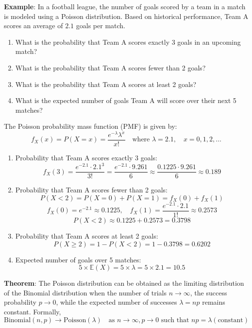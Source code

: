 \documentclass[twoside]{book}
\begin{document}
\textbf{Example}: In a football league, the number of goals scored by a team in a match is modeled using a Poisson distribution. Based on historical performance, Team A scores an average of $2.1$ goals per match.

\begin{enumerate}
    \item What is the probability that Team A scores exactly 3 goals in an upcoming match?
    \item What is the probability that Team A scores fewer than 2 goals?
    \item What is the probability that Team A scores at least 2 goals?
    \item What is the expected number of goals Team A will score over their next 5 matches?
\end{enumerate}

The Poisson probability mass function (PMF) is given by:
\[
f_X(x) = P(X=x)= \frac{e^{-\lambda} \lambda^x}{x!}
\quad \text{where } \lambda = 2.1, \quad x = 0, 1, 2, \dots
\]

\begin{enumerate}
    \item {Probability that Team A scores exactly 3 goals:}
    \[
    f_X(3)  = \frac{e^{-2.1} \cdot 2.1^3}{3!}
    = \frac{e^{-2.1} \cdot 9.261}{6}
    \approx \frac{0.1225 \cdot 9.261}{6}
    \approx 0.189
    \]

    \item {Probability that Team A scores fewer than 2 goals:}
    \[
    P(X < 2) = {P}(X = 0) + {P}(X = 1) = f_X(0) + f_X(1)
    \]
    \[
    f_X(0) = e^{-2.1} \approx 0.1225, \quad
    f_X(1) = \frac{e^{-2.1} \cdot 2.1}{1!} \approx 0.2573
    \]
    \[
    P(X < 2) \approx 0.1225 + 0.2573 = 0.3798
    \]

    \item {Probability that Team A scores at least 2 goals:}
    \[
    P(X \geq 2) = 1 - P(X < 2) = 1 - 0.3798 = 0.6202
    \]

    \item {Expected number of goals over 5 matches:}
    \[
    5 \times \mathbb{E}(X) = 5 \times \lambda = 5 \times 2.1 = 10.5
    \]
\end{enumerate}

\begin{textbox}
\textbf{Theorem}: The Poisson distribution can be obtained as the limiting distribution of the Binomial distribution when the number of trials \( n \to \infty \), the success probability \( p \to 0\), while the expected number of successes \( \lambda = np \) remains constant. Formally,
\[
\text{Binomial}(n, p) \longrightarrow \text{Poisson}(\lambda) \quad \text{as } n \to \infty, p \to 0 \text{ such that } np = \lambda (\text{constant})
\]
\end{textbox}
\end{document}
